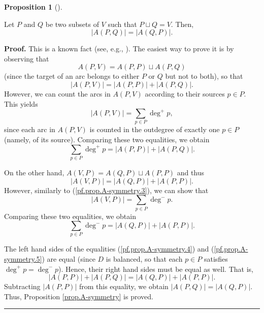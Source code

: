 \documentclass[numbers=enddot,12pt,final,onecolumn,notitlepage]{scrartcl}%
\theoremstyle{definition}
\newtheorem{prop}[theo]{Proposition}
\newenvironment{proposition}[1][]
{\begin{prop}[#1]\begin{leftbar}}
{\end{leftbar}\end{prop}}
\newenvironment{proof}[1][Proof]{\noindent\textbf{#1.} }{\ \rule{0.5em}{0.5em}}
\let\sumnonlimits\sum
\renewcommand{\sum}{\sumnonlimits\limits}
\theoremstyle{plainsl}
\begin{document}
\begin{proposition}
\label{prop.A-symmetry}Let $P$ and $Q$ be two subsets of $V$ such that
$P\sqcup Q=V$. Then,
\[
\left\vert A\left(  P,Q\right)  \right\vert =\left\vert A\left(  Q,P\right)
\right\vert .
\]

\end{proposition}

\begin{proof}
This is a known fact (see, e.g., \cite[Exercise 9.1]{22s}). The easiest way to
prove it is by observing that%
\[
A\left(  P,V\right)  =A\left(  P,P\right)  \sqcup A\left(  P,Q\right)
\]
(since the target of an arc belongs to either $P$ or $Q$ but not to both), so
that%
\[
\left\vert A\left(  P,V\right)  \right\vert =\left\vert A\left(  P,P\right)
\right\vert +\left\vert A\left(  P,Q\right)  \right\vert .
\]
However, we can count the arcs in $A\left(  P,V\right)  $ according to their
sources $p\in P$. This yields%
\begin{equation}
\left\vert A\left(  P,V\right)  \right\vert =\sum_{p\in P}\deg^{+}p,
\label{pf.prop.A-symmetry.3}%
\end{equation}
since each arc in $A\left(  P,V\right)  $ is counted in the outdegree of
exactly one $p\in P$ (namely, of its source). Comparing these two equalities,
we obtain%
\begin{equation}
\sum_{p\in P}\deg^{+}p=\left\vert A\left(  P,P\right)  \right\vert +\left\vert
A\left(  P,Q\right)  \right\vert . \label{pf.prop.A-symmetry.4}%
\end{equation}


On the other hand, $A\left(  V,P\right)  =A\left(  Q,P\right)  \sqcup A\left(
P,P\right)  $ and thus%
\[
\left\vert A\left(  V,P\right)  \right\vert =\left\vert A\left(  Q,P\right)
\right\vert +\left\vert A\left(  P,P\right)  \right\vert .
\]
However, similarly to (\ref{pf.prop.A-symmetry.3}), we can show that%
\[
\left\vert A\left(  V,P\right)  \right\vert =\sum_{p\in P}\deg^{-}p.
\]
Comparing these two equalities, we obtain%
\begin{equation}
\sum_{p\in P}\deg^{-}p=\left\vert A\left(  Q,P\right)  \right\vert +\left\vert
A\left(  P,P\right)  \right\vert . \label{pf.prop.A-symmetry.5}%
\end{equation}


The left hand sides of the equalities (\ref{pf.prop.A-symmetry.4}) and
(\ref{pf.prop.A-symmetry.5}) are equal (since $D$ is balanced, so that each
$p\in P$ satisfies $\deg^{+}p=\deg^{-}p$). Hence, their right hand sides must
be equal as well. That is,%
\[
\left\vert A\left(  P,P\right)  \right\vert +\left\vert A\left(  P,Q\right)
\right\vert =\left\vert A\left(  Q,P\right)  \right\vert +\left\vert A\left(
P,P\right)  \right\vert .
\]
Subtracting $\left\vert A\left(  P,P\right)  \right\vert $ from this equality,
we obtain $\left\vert A\left(  P,Q\right)  \right\vert =\left\vert A\left(
Q,P\right)  \right\vert $. Thus, Proposition \ref{prop.A-symmetry} is proved.
\end{proof}
\end{document}
